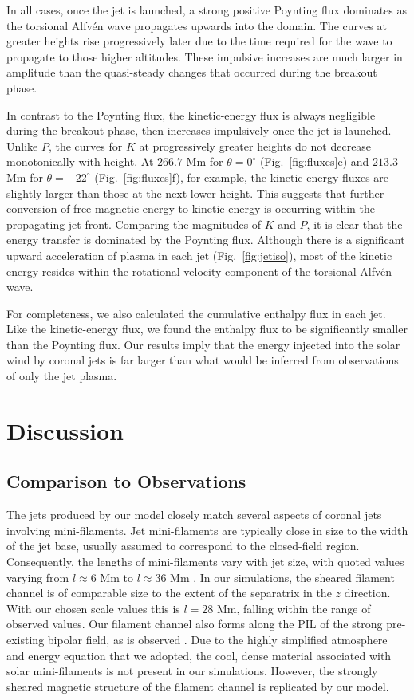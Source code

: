 \documentclass[twocolumn]{aastex6}
\begin{document}
In all cases, once the jet is launched, a strong positive Poynting flux dominates as the torsional Alfv\'{e}n wave propagates upwards into the domain. The curves at greater heights rise progressively later due to the time required for the wave to propagate to those higher altitudes. These impulsive increases are much larger in amplitude than the quasi-steady changes that occurred during the breakout phase. 

In contrast to the Poynting flux, the kinetic-energy flux is always negligible during the breakout phase, then increases impulsively once the jet is launched. Unlike $P$, the curves for $K$ at progressively greater heights do not decrease monotonically with height. At $266.7$ Mm for $\theta = 0^\circ$ (Fig.\ \ref{fig:fluxes}e) and $213.3$ Mm for $\theta = -22^\circ$ (Fig.\ \ref{fig:fluxes}f), for example, the kinetic-energy fluxes are slightly larger than those at the next lower height. This suggests that further conversion of free magnetic energy to kinetic energy is occurring within the propagating jet front. Comparing the magnitudes of $K$ and $P$, it is clear that the energy transfer is dominated by the Poynting flux. Although there is a significant upward acceleration of plasma in each jet (Fig.\ \ref{fig:jetiso}), most of the kinetic energy resides within the rotational velocity component of the torsional Alfv\'{e}n wave. 

For completeness, we also calculated the cumulative enthalpy flux in each jet. Like the kinetic-energy flux, we found the enthalpy flux to be significantly smaller than the Poynting flux. Our results imply that the energy injected into the solar wind by coronal jets is far larger than what would be inferred from observations of only the jet plasma.  

\section{Discussion}
\label{sec:discussion}

\subsection{Comparison to Observations}
The jets produced by our model closely match several aspects of coronal jets involving mini-filaments. Jet mini-filaments are typically close in size to the width of the jet base, usually assumed to correspond to the closed-field region. Consequently, the lengths of mini-filaments vary with jet size, with quoted values varying from $l \approx 6$ Mm to $l \approx 36$ Mm \citep[e.g.][]{Sterling2015,Panesar2016}. In our simulations, the sheared filament channel is of comparable size to the extent of the separatrix in the $z$ direction. With our chosen scale values this is $l = 28$ Mm, falling within the range of observed values. Our filament channel also forms along the PIL of the strong pre-existing bipolar field, as is observed \citep[e.g.][]{Adams2014,Panesar2016}. Due to the highly simplified atmosphere and energy equation that we adopted, the cool, dense material associated with solar mini-filaments is not present in our simulations. However, the strongly sheared magnetic structure of the filament channel is replicated by our model.
\end{document}
